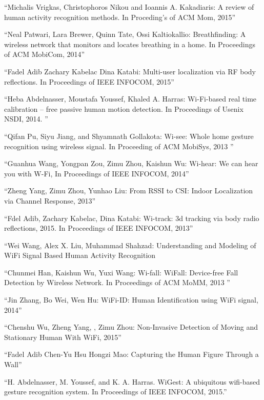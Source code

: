 \documentclass[conference]{IEEEtran}
\begin{document}
\begin{thebibliography}{99}

 “Michalis Vrigkas, Christophoros Nikou and Ioannis A. Kakadiaris: A review of human activity recognition methods. In Proceding’s of ACM Mom, 2015”

“Neal Patwari, Lara Brewer, Quinn Tate, Ossi Kaltiokallio: Breathfinding: A wireless network that monitors and locates breathing in a home. In Proceedings of ACM MobiCom, 2014”

 “Fadel Adib Zachary Kabelac Dina Katabi:
 Multi-user localization via RF body reflections. In Proceedings of IEEE INFOCOM, 2015”

 “Heba Abdelnasser, Moustafa Youssef, Khaled A. Harras: Wi-Fi-based real time calibration – free passive human motion detection. In Proceedings of Usenix NSDI, 2014. ”

“Qifan Pu, Siyu Jiang, and Shyamnath Gollakota: Wi-see: Whole home gesture recognition using wireless signal. In Proceeding of ACM MobiSys, 2013 ”

 “Guanhua Wang, Yongpan Zou, Zimu Zhou, Kaishun Wu: Wi-hear: We can hear you with W-Fi, In Proceedings of IEEE INFOCOM, 2014”

 “Zheng Yang, Zimu Zhou, Yunhao Liu: From RSSI to CSI: Indoor Localization via Channel Response, 2013”

“Fdel Adib, Zachary Kabelac, Dina Katabi: Wi-track: 3d tracking via body radio reflections, 2015. In Proceedings of IEEE INFOCOM, 2013”

“Wei Wang, Alex X. Liu, Muhammad Shahzad: Understanding and Modeling of WiFi Signal Based Human Activity Recognition

 “Chunmei Han, Kaishun Wu, Yuxi Wang: Wi-fall: WiFall: Device-free Fall Detection by Wireless Network. In Proceedings of ACM MoMM, 2013 ”

 “Jin Zhang, Bo Wei, Wen Hu: WiFi-ID: Human Identification using WiFi signal, 2014”

 “Chenshu Wu, Zheng Yang, , Zimu Zhou: Non-Invasive Detection of Moving and Stationary Human With WiFi, 2015”

 “Fadel Adib Chen-Yu Hsu Hongzi Mao: Capturing the Human Figure Through a Wall”

 “H. Abdelnasser, M. Youssef, and K. A. Harras. WiGest: A ubiquitous wifi-based gesture recognition system. In Proceedings of IEEE INFOCOM, 2015.”


\end{thebibliography}
\end{document}
